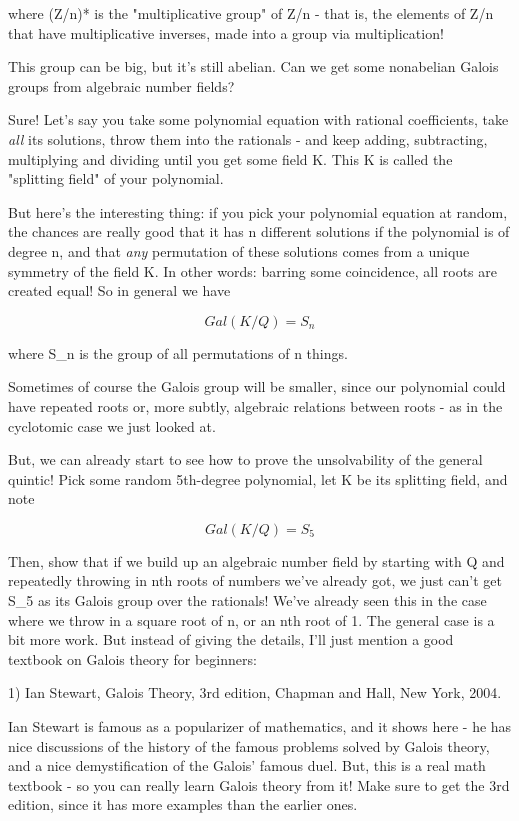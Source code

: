 where (Z/n)* is the "multiplicative group" of Z/n - that is, the 
elements of Z/n that have multiplicative inverses, made into a group 
via multiplication!  

This group can be big, but it's still abelian.  Can we get some nonabelian
Galois groups from algebraic number fields?

Sure!  Let's say you take some polynomial equation with rational coefficients, 
take \emph{all} its solutions, throw them into the rationals - and keep 
adding, 
subtracting, multiplying and dividing until you get some field K.  This K 
is called the "splitting field" of your polynomial.  

But here's the interesting thing: if you pick your polynomial equation at 
random, the chances are really good that it has n different solutions if 
the polynomial is of degree n, and that \emph{any} permutation of these 
solutions comes from a unique symmetry of the field K.  In other words:
barring some coincidence, all roots are created equal!  So in general we 
have


$$

Gal(K/Q) = S_{n}
$$
    
where S_{n} is the group of all permutations of n things.

Sometimes of course the Galois group will be smaller, since our polynomial
could have repeated roots or, more subtly, algebraic relations between
roots - as in the cyclotomic case we just looked at.  

But, we can already start to see how to prove the unsolvability of the 
general quintic!  Pick some random 5th-degree polynomial, let K be its
splitting field, and note


$$

Gal(K/Q) = S_{5}
$$
    
Then, show that if we build up an algebraic number field by starting
with Q and repeatedly throwing in nth roots of numbers we've already got, 
we just can't get S_{5} as its Galois group over the rationals!  We've 
already seen this in the case where we throw in a square root of n, or 
an nth root of 1.  The general case is a bit more work.  But instead of 
giving the details, I'll just mention a good textbook on Galois theory for 
beginners:

1) Ian Stewart, Galois Theory, 3rd edition, Chapman and Hall, New York, 
2004.

Ian Stewart is famous as a popularizer of mathematics, and it shows
here - he has nice discussions of the history of the famous problems
solved by Galois theory, and a nice demystification of the Galois'
famous duel.  But, this is a real math textbook - so you can really 
learn Galois theory from it!  Make sure to get the 3rd edition, since
it has more examples than the earlier ones.

